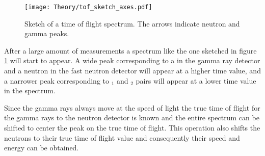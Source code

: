 \documentclass[main.tex]{subfiles}
\begin{document}
\begin{figure}[t]
    \centering
        \texttt{[image: Theory/tof\_sketch\_axes.pdf]}
        \caption[Sketch of a time of flight spectrum.]{Sketch of a time of flight spectrum. The arrows indicate neutron and gamma peaks.}
    \label{fig:tof_sketch} 
\end{figure}

After a large amount of measurements a spectrum like the one sketched in figure \ref{fig:tof_sketch} will start to appear. A wide peak corresponding to a \textgamma\; in the gamma ray detector and a neutron in the fast neutron detector will appear at a higher time value, and a narrower peak corresponding to \textgamma$_\text{1}$ and \textgamma$_\text{2}$ pairs will appear at a lower time value in the spectrum.


Since the gamma rays always move at the speed of light the true time of flight for the gamma rays to the neutron detector is known and the entire spectrum can be shifted to center the \textgamma\textgamma\; peak on the true \textgamma\; time of flight. This operation also shifts the neutrons to their true time of flight value and consequently their speed and energy can be obtained.
\end{document}
